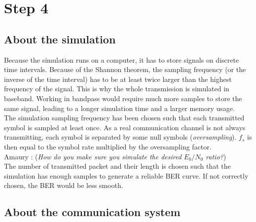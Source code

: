 \setcounter{secnumdepth}{-1}

\chapter{Step 4}

\section{About the simulation}

Because the simulation runs on a computer, it has to store signals on discrete time intervals. Because of the Shannon theorem, the sampling frequency (or the inverse of the time interval) has to be at least twice larger than the highest frequency of the signal. This is why the whole transmission is simulated in baseband. Working in bandpass would require much more samples to store the same signal, leading to a longer simulation time and a larger memory usage. \\

The simulation sampling frequency has been chosen such that each transmitted symbol is sampled at least once. As a real communication channel is not always transmitting, each symbol is separated by some null symbols (\textit{oversampling}). $f_s$ is then equal to the symbol rate multiplied by the oversampling factor. \\

{\Large Amaury : (\textit{How do you make sure you simulate the desired $E_b/N_0$ ratio?})} \\

The number of transmitted packet and their length is chosen such that the simulation has enough samples to generate a reliable BER curve. If not correctly chosen, the BER would be less smooth.\\

\section{About the communication system}

